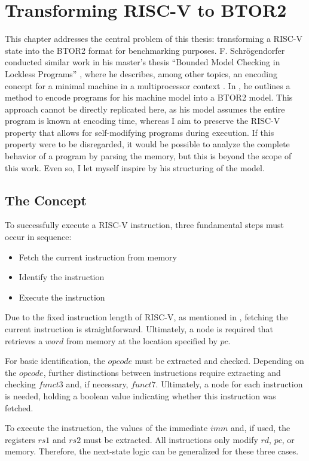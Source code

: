 \chapter{Transforming RISC-V to BTOR2}\label{chap:riscv_to_btor2}

This chapter addresses the central problem of this thesis:
transforming a RISC-V state into the BTOR2 format for benchmarking
purposes. F. Schrögendorfer conducted similar work in his master's
thesis \enquote{Bounded Model Checking in Lockless Programs}
\cite{bmcOfLockless}, where he describes, among other topics, an
encoding concept for a minimal machine in a multiprocessor context
\cite[Chapter 2]{bmcOfLockless}. In \cite[Chapter 8]{bmcOfLockless},
he outlines a method to encode programs for his machine model into a
BTOR2 model. This approach cannot be directly replicated here, as his
model assumes the entire program is known at encoding time, whereas I
aim to preserve the RISC-V property that allows for self-modifying
programs during execution. If this property were to be disregarded,
it would be possible to analyze the complete behavior of a program by
parsing the memory, but this is beyond the scope of this work. Even
so, I let myself inspire by his structuring of the model.

\section{The Concept}
To successfully execute a RISC-V instruction, three fundamental steps
must occur in sequence:
\begin{itemize}
    \item Fetch the current instruction from memory
    \item Identify the instruction
    \item Execute the instruction
\end{itemize}
Due to the fixed instruction length of RISC-V, as mentioned in , fetching the current instruction is straightforward. Ultimately, a node is required that retrieves a $word$ from memory at the location specified by $pc$.

For basic identification, the $opcode$ must be extracted and checked.
Depending on the $opcode$, further distinctions between instructions
require extracting and checking $funct3$ and, if necessary, $funct7$.
Ultimately, a node for each instruction is needed, holding a boolean
value indicating whether this instruction was fetched.

To execute the instruction, the values of the immediate $imm$ and, if
used, the registers $rs1$ and $rs2$ must be extracted. All
instructions only modify $rd$, $pc$, or memory. Therefore, the
next-state logic can be generalized for these three cases.

